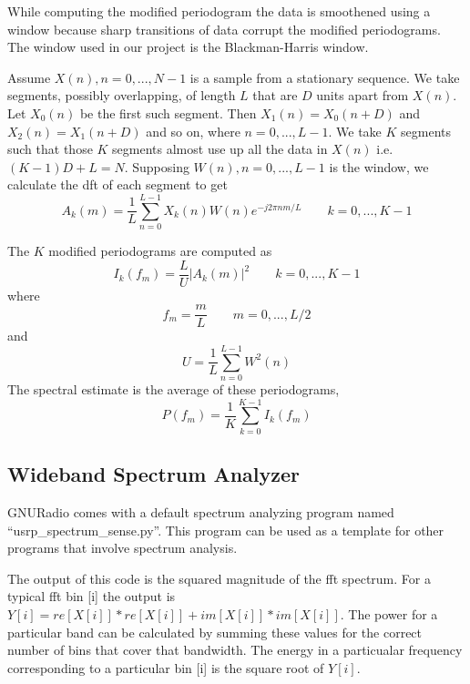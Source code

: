 While computing the modified periodogram the data is smoothened using a window
because sharp transitions of data corrupt the modified periodograms. The 
window used in our project is the Blackman-Harris window.

Assume $X(n), n=0, ..., N-1$ is a sample from a stationary sequence. We take
segments, possibly overlapping, of length $L$ that are $D$ units apart from 
$X(n)$. Let $X_0(n)$ be the first such segment. Then $X_1(n) = X_0(n+D)$ and
$X_2(n) = X_1(n+D)$ and so on, where $n=0, ..., L-1$. We take $K$ segments
such that those $K$ segments almost use up all the data in $X(n)$ i.e.
$ (K-1)D + L = N$. Supposing $W(n), n=0, ..., L-1$ is the window, we calculate
the \gls{dft} of each segment to get
\begin{equation*}
    A_k(m) = \frac{1}{L}\sum_{n=0}^{L-1}X_k(n)W(n)e^{-j2\pi nm/L} \qquad
    k = 0, ..., K-1
\end{equation*}

The $K$ modified periodograms are computed as 
\begin{equation*}
    I_k(f_m) = \frac{L}{U}\left|A_k(m)\right|^2 \qquad k = 0, ..., K-1
\end{equation*}
where
\begin{equation*}
    f_m = \frac{m}{L} \qquad m = 0, ..., L/2
\end{equation*}
and
\begin{equation*}
    U = \frac{1}{L}\sum_{n=0}^{L-1}W^2(n)
\end{equation*}
The spectral estimate is the average of these periodograms,
\begin{equation*}
    P(f_m) = \frac{1}{K}\sum_{k=0}^{K-1}I_k(f_m)
\end{equation*}

\subsection{Wideband Spectrum Analyzer}

GNURadio comes with a default spectrum analyzing program named 
``usrp\_spectrum\_sense.py''. This program can be used as a template for other
programs that involve spectrum analysis.

The output of this code is the squared magnitude of the \gls{fft}  spectrum. For a 
typical \gls{fft}  bin [i] the output is 
$Y[i] = re[X[i]]*re[X[i]] + im[X[i]]*im[X[i]]$. The power for a particular 
band can be calculated by summing these values for the correct number of bins
that cover that bandwidth. The energy in a particualar frequency corresponding
to a particular bin [i] is the square root of $Y[i]$. 

